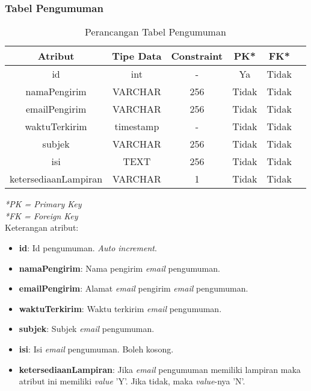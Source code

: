 \subsubsection{Tabel Pengumuman}
\begin{center}
	\begin{table}[H]
	\caption{Perancangan Tabel Pengumuman}
	\begin{tabular}{|c|c|c|c|c|c|}
 			\hline
			\textbf{Atribut} & \textbf{Tipe Data} & \textbf{Constraint} & \textbf{PK*}  & \textbf{FK*} \\
			\hline
		 	 id & int & - & Ya & Tidak\\
			\hline
			 namaPengirim & VARCHAR & 256 & Tidak & Tidak\\
            \hline
			 emailPengirim & VARCHAR & 256 & Tidak & Tidak\\
            \hline
			 waktuTerkirim & timestamp & - & Tidak & Tidak\\
            \hline
			 subjek & VARCHAR & 256 & Tidak & Tidak\\
            \hline
			 isi & TEXT & 256 & Tidak & Tidak\\
            \hline
			 ketersediaanLampiran & VARCHAR & 1 & Tidak & Tidak\\
			\hline
	\end{tabular}
	\end{table}
\end{center}
\textit{*PK = Primary Key} \\
\textit{*FK = Foreign Key} \\

Keterangan atribut:
\begin{itemize}
\item \textbf{id}: Id pengumuman. \textit{Auto increment}.
\item \textbf{namaPengirim}: Nama pengirim \textit{email} pengumuman.
\item \textbf{emailPengirim}: Alamat \textit{email} pengirim \textit{email} pengumuman.
\item \textbf{waktuTerkirim}: Waktu terkirim \textit{email} pengumuman.
\item \textbf{subjek}: Subjek \textit{email} pengumuman.
\item \textbf{isi}: Isi \textit{email} pengumuman. Boleh kosong.
\item \textbf{ketersediaanLampiran}: Jika \textit{email} pengumuman memiliki lampiran maka atribut ini memiliki \textit{value} 'Y'. Jika tidak, maka \textit{value}-nya 'N'.
\end{itemize}

